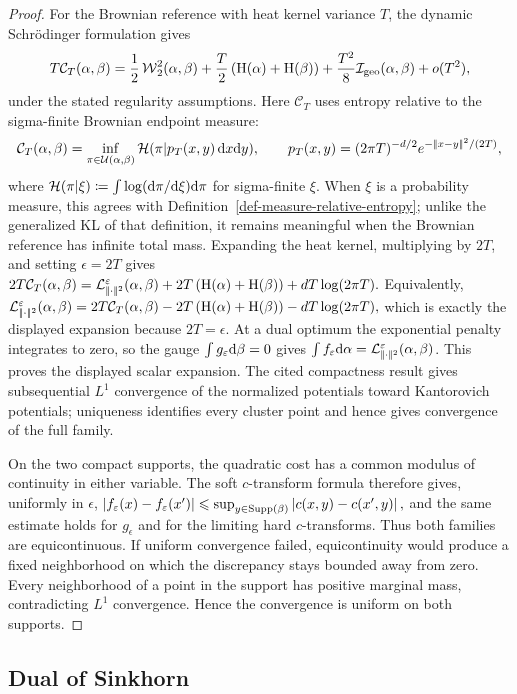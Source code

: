 \begin{proof}
For the Brownian reference with heat kernel variance $T$, the dynamic Schr\"odinger formulation gives
\[
T\mathcal C_T(\alpha,\beta)
=
\frac12\operatorname{\mathcal{W}}_2^2(\alpha,\beta)
+\frac{T}{2}\left( \mathrm H(\alpha)+\mathrm H(\beta) \right)
+\frac{T^2}{8}\mathcal I_{\rm geo}(\alpha,\beta)+o(T^2),
\]
under the stated regularity assumptions. Here $\mathscr C_T$ uses entropy relative to the sigma-finite Brownian endpoint measure:
\[
\mathcal C_T(\alpha,\beta)
=
\inf_{\pi\in\mathcal{U}(\alpha,\beta)}
\mathcal H(\pi|p_T(x,y)\,\mathrm{d} x\mathrm{d} y),
\qquad
p_T(x,y)=(2\pi T)^{-d/2}e^{-|\!| x-y |\!|^2/(2T)},
\]
where $\mathcal H(\pi|\xi)\coloneqq\int\log(\mathrm{d}\pi/\mathrm{d}\xi)\mathrm{d}\pi$ for sigma-finite $\xi$. When $\xi$ is a probability measure, this agrees with Definition~\ref{def-measure-relative-entropy}; unlike the generalized KL of that definition, it remains meaningful when the Brownian reference has infinite total mass. Expanding the heat kernel, multiplying by $2T$, and setting $\epsilon=2T$ gives
\(2T\mathcal C_T(\alpha,\beta) = \mathcal{L}_{|\!| \cdot |\!|^2}^{\varepsilon}(\alpha,\beta) +2T\left( \mathrm H(\alpha)+\mathrm H(\beta) \right) +dT\log(2\pi T).\)
Equivalently, \(\mathcal{L}_{|\!| \cdot |\!|^2}^{\varepsilon}(\alpha,\beta) = 2T\mathcal C_T(\alpha,\beta) -2T\left( \mathrm H(\alpha)+\mathrm H(\beta) \right) -dT\log(2\pi T),\)
which is exactly the displayed expansion because $2T=\epsilon$. At a dual optimum the exponential penalty integrates to zero, so the gauge $\int g_\varepsilon\mathrm{d}\beta=0$ gives $\int f_\varepsilon\mathrm{d}\alpha=\mathcal{L}_{|\!| \cdot |\!|^2}^\varepsilon(\alpha,\beta)$. This proves the displayed scalar expansion. The cited compactness result gives subsequential $L^1$ convergence of the normalized potentials toward Kantorovich potentials; uniqueness identifies every cluster point and hence gives convergence of the full family.

On the two compact supports, the quadratic cost has a common modulus of continuity in either variable. The soft $c$-transform formula therefore gives, uniformly in $\epsilon$,
\(\left\lvert f_\varepsilon(x)-f_\varepsilon(x')\right\rvert \leqslant\sup_{y\in\operatorname{Supp}(\beta)}\left\lvert c(x,y)-c(x',y)\right\rvert,\)
and the same estimate holds for $g_\epsilon$ and for the limiting hard $c$-transforms. Thus both families are equicontinuous. If uniform convergence failed, equicontinuity would produce a fixed neighborhood on which the discrepancy stays bounded away from zero. Every neighborhood of a point in the support has positive marginal mass, contradicting $L^1$ convergence. Hence the convergence is uniform on both supports.
\end{proof}
\subsection{Dual of Sinkhorn}\label{sec-dual-sinkhorn}
